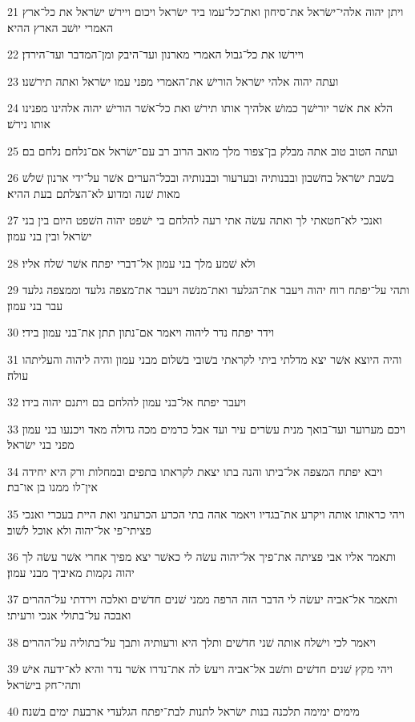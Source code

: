 \par 21 ויתן יהוה אלהי־ישׂראל את־סיחון ואת־כל־עמו ביד ישׂראל ויכום ויירשׁ ישׂראל את כל־ארץ האמרי יושׁב הארץ ההיא׃
\par 22 ויירשׁו את כל־גבול האמרי מארנון ועד־היבק ומן־המדבר ועד־הירדן׃
\par 23 ועתה יהוה אלהי ישׂראל הורישׁ את־האמרי מפני עמו ישׂראל ואתה תירשׁנו׃
\par 24 הלא את אשׁר יורישׁך כמושׁ אלהיך אותו תירשׁ ואת כל־אשׁר הורישׁ יהוה אלהינו מפנינו אותו נירשׁ׃
\par 25 ועתה הטוב טוב אתה מבלק בן־צפור מלך מואב הרוב רב עם־ישׂראל אם־נלחם נלחם בם׃
\par 26 בשׁבת ישׂראל בחשׁבון ובבנותיה ובערעור ובבנותיה ובכל־הערים אשׁר על־ידי ארנון שׁלשׁ מאות שׁנה ומדוע לא־הצלתם בעת ההיא׃
\par 27 ואנכי לא־חטאתי לך ואתה עשׂה אתי רעה להלחם בי ישׁפט יהוה השׁפט היום בין בני ישׂראל ובין בני עמון׃
\par 28 ולא שׁמע מלך בני עמון אל־דברי יפתח אשׁר שׁלח אליו׃
\par 29 ותהי על־יפתח רוח יהוה ויעבר את־הגלעד ואת־מנשׁה ויעבר את־מצפה גלעד וממצפה גלעד עבר בני עמון׃
\par 30 וידר יפתח נדר ליהוה ויאמר אם־נתון תתן את־בני עמון בידי׃
\par 31 והיה היוצא אשׁר יצא מדלתי ביתי לקראתי בשׁובי בשׁלום מבני עמון והיה ליהוה והעליתהו עולה׃
\par 32 ויעבר יפתח אל־בני עמון להלחם בם ויתנם יהוה בידו׃
\par 33 ויכם מערוער ועד־בואך מנית עשׂרים עיר ועד אבל כרמים מכה גדולה מאד ויכנעו בני עמון מפני בני ישׂראל׃
\par 34 ויבא יפתח המצפה אל־ביתו והנה בתו יצאת לקראתו בתפים ובמחלות ורק היא יחידה אין־לו ממנו בן או־בת׃
\par 35 ויהי כראותו אותה ויקרע את־בגדיו ויאמר אהה בתי הכרע הכרעתני ואת היית בעכרי ואנכי פציתי־פי אל־יהוה ולא אוכל לשׁוב׃
\par 36 ותאמר אליו אבי פציתה את־פיך אל־יהוה עשׂה לי כאשׁר יצא מפיך אחרי אשׁר עשׂה לך יהוה נקמות מאיביך מבני עמון׃
\par 37 ותאמר אל־אביה יעשׂה לי הדבר הזה הרפה ממני שׁנים חדשׁים ואלכה וירדתי על־ההרים ואבכה על־בתולי אנכי ורעיתי׃
\par 38 ויאמר לכי וישׁלח אותה שׁני חדשׁים ותלך היא ורעותיה ותבך על־בתוליה על־ההרים׃
\par 39 ויהי מקץ שׁנים חדשׁים ותשׁב אל־אביה ויעשׂ לה את־נדרו אשׁר נדר והיא לא־ידעה אישׁ ותהי־חק בישׂראל׃
\par 40 מימים ימימה תלכנה בנות ישׂראל לתנות לבת־יפתח הגלעדי ארבעת ימים בשׁנה׃

